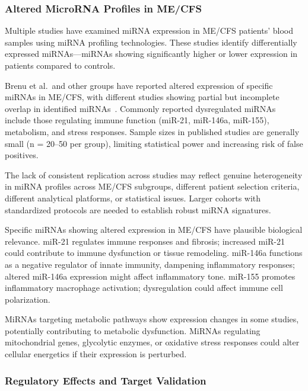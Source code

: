 \subsubsection{Altered MicroRNA Profiles in ME/CFS}

Multiple studies have examined miRNA expression in ME/CFS patients' blood samples using miRNA profiling technologies. These studies identify differentially expressed miRNAs---miRNAs showing significantly higher or lower expression in patients compared to controls.

\begin{observation}
Brenu et al.\ and other groups have reported altered expression of specific miRNAs in ME/CFS, with different studies showing partial but incomplete overlap in identified miRNAs~\cite{Brenu2012miRNA}. Commonly reported dysregulated miRNAs include those regulating immune function (miR-21, miR-146a, miR-155), metabolism, and stress responses. Sample sizes in published studies are generally small (n = 20--50 per group), limiting statistical power and increasing risk of false positives.

The lack of consistent replication across studies may reflect genuine heterogeneity in miRNA profiles across ME/CFS subgroups, different patient selection criteria, different analytical platforms, or statistical issues. Larger cohorts with standardized protocols are needed to establish robust miRNA signatures.
\end{observation}

Specific miRNAs showing altered expression in ME/CFS have plausible biological relevance. miR-21 regulates immune responses and fibrosis; increased miR-21 could contribute to immune dysfunction or tissue remodeling. miR-146a functions as a negative regulator of innate immunity, dampening inflammatory responses; altered miR-146a expression might affect inflammatory tone. miR-155 promotes inflammatory macrophage activation; dysregulation could affect immune cell polarization.

MiRNAs targeting metabolic pathways show expression changes in some studies, potentially contributing to metabolic dysfunction. MiRNAs regulating mitochondrial genes, glycolytic enzymes, or oxidative stress responses could alter cellular energetics if their expression is perturbed.

\subsubsection{Regulatory Effects and Target Validation}


